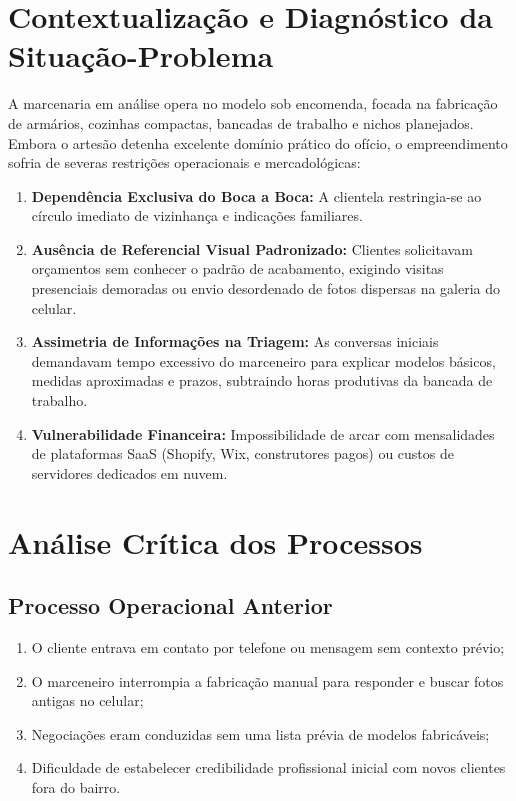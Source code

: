 \documentclass[12pt,a4paper]{article}
\begin{document}
\section{Contextualização e Diagnóstico da Situação-Problema}

A marcenaria em análise opera no modelo sob encomenda, focada na fabricação de armários, cozinhas compactas, bancadas de trabalho e nichos planejados. Embora o artesão detenha excelente domínio prático do ofício, o empreendimento sofria de severas restrições operacionais e mercadológicas:

\begin{enumerate}[leftmargin=*]
\item \textbf{Dependência Exclusiva do Boca a Boca:} A clientela restringia-se ao círculo imediato de vizinhança e indicações familiares.
\item \textbf{Ausência de Referencial Visual Padronizado:} Clientes solicitavam orçamentos sem conhecer o padrão de acabamento, exigindo visitas presenciais demoradas ou envio desordenado de fotos dispersas na galeria do celular.
\item \textbf{Assimetria de Informações na Triagem:} As conversas iniciais demandavam tempo excessivo do marceneiro para explicar modelos básicos, medidas aproximadas e prazos, subtraindo horas produtivas da bancada de trabalho.
\item \textbf{Vulnerabilidade Financeira:} Impossibilidade de arcar com mensalidades de plataformas SaaS (Shopify, Wix, construtores pagos) ou custos de servidores dedicados em nuvem.
\end{enumerate}



\section{Análise Crítica dos Processos}

\subsection{Processo Operacional Anterior}
\begin{enumerate}[leftmargin=*]
\item O cliente entrava em contato por telefone ou mensagem sem contexto prévio;
\item O marceneiro interrompia a fabricação manual para responder e buscar fotos antigas no celular;
\item Negociações eram conduzidas sem uma lista prévia de modelos fabricáveis;
\item Dificuldade de estabelecer credibilidade profissional inicial com novos clientes fora do bairro.
\end{enumerate}
\end{document}
